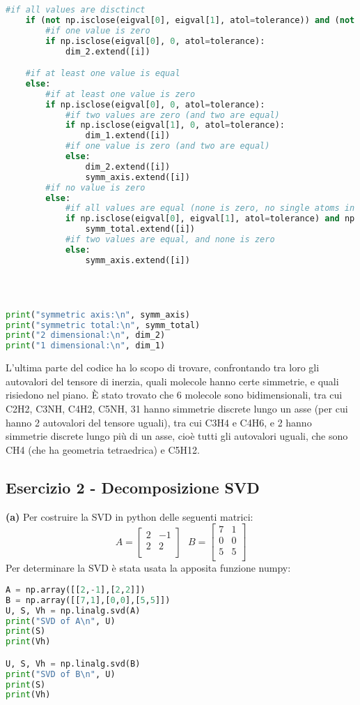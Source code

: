\documentclass{article}
\begin{document}
\begin{lstlisting}[language = Python]
    #if all values are disctinct
    if (not np.isclose(eigval[0], eigval[1], atol=tolerance)) and (not np.isclose(eigval[1], eigval[2], atol=tolerance)) :
        #if one value is zero
        if np.isclose(eigval[0], 0, atol=tolerance):
            dim_2.extend([i])

    #if at least one value is equal
    else:
        #if at least one value is zero
        if np.isclose(eigval[0], 0, atol=tolerance):
            #if two values are zero (and two are equal)
            if np.isclose(eigval[1], 0, atol=tolerance):
                dim_1.extend([i])
            #if one value is zero (and two are equal)
            else:
                dim_2.extend([i])
                symm_axis.extend([i])
        #if no value is zero
        else:
            #if all values are equal (none is zero, no single atoms in the dataset)
            if np.isclose(eigval[0], eigval[1], atol=tolerance) and np.isclose(eigval[1], eigval[2], atol=tolerance):
                symm_total.extend([i])
            #if two values are equal, and none is zero
            else:
                symm_axis.extend([i])

    
    

print("symmetric axis:\n", symm_axis)
print("symmetric total:\n", symm_total)
print("2 dimensional:\n", dim_2)
print("1 dimensional:\n", dim_1)
\end{lstlisting}

L'ultima parte del codice ha lo scopo di trovare, confrontando tra loro gli autovalori del tensore di inerzia, quali molecole hanno certe simmetrie, e quali risiedono nel piano. È stato trovato che 6 molecole sono bidimensionali, tra cui C2H2, C3NH, C4H2, C5NH, 31 hanno simmetrie discrete lungo un asse (per cui hanno 2 autovalori del tensore uguali), tra cui C3H4 e C4H6, e 2 hanno simmetrie discrete lungo più di un asse, cioè tutti gli autovalori uguali, che sono CH4 (che ha geometria tetraedrica) e C5H12.


\subsection*{Esercizio 2 - Decomposizione SVD}
\textbf{(a)}
Per costruire la SVD in python delle seguenti matrici:
\[
A = 
\begin{bmatrix}
    2 & -1 \\
    2 & 2 \\
\end{bmatrix}
\,\,\,\,
B =
\begin{bmatrix}
    7 & 1 \\
    0 & 0 \\
    5 & 5 \\
\end{bmatrix}
\]
Per determinare la SVD è stata usata la apposita funzione numpy:
\begin{lstlisting}[language = Python]
A = np.array([[2,-1],[2,2]])
B = np.array([[7,1],[0,0],[5,5]])
U, S, Vh = np.linalg.svd(A)
print("SVD of A\n", U)
print(S)
print(Vh)

U, S, Vh = np.linalg.svd(B)
print("SVD of B\n", U)
print(S)
print(Vh)
\end{lstlisting}
\end{document}
